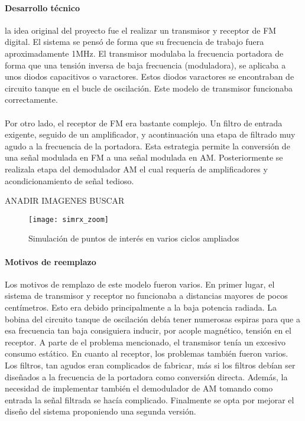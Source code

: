 \paragraph{Desarrollo técnico}
la idea original del proyecto fue el realizar un transmisor y receptor de FM digital. El sistema se pensó de forma que su frecuencia de trabajo fuera aproximadamente 1MHz. 
El transmisor modulaba la frecuencia portadora de forma que una tensión inversa de baja frecuencia (moduladora), se aplicaba a unos diodos capacitivos o varactores. Estos diodos varactores se encontraban de circuito tanque en el bucle de oscilación.
Este modelo de transmisor funcionaba correctamente.

\paragraph{}
Por otro lado, el receptor de FM era bastante complejo. Un filtro de entrada exigente, seguido de un amplificador, y acontinuación una etapa de filtrado muy agudo a la frecuencia de la portadora. Esta estrategia permite la conversión de una señal modulada en FM a una señal modulada en AM. Posteriormente se realizala etapa del demodulador AM el cual requería de amplificadores y acondicionamiento de señal tedioso.  

ANADIR IMAGENES BUSCAR
\begin{figure}[h]
    \centering
    \texttt{[image: simrx\_zoom]}
    \caption{Simulación de puntos de interés en varios ciclos ampliados}
    \label{fig:simrx_zoom}
\end{figure}

\paragraph{Motivos de reemplazo}
Los motivos de remplazo de este modelo fueron varios.
En primer lugar, el sistema de transmisor y receptor no funcionaba a distancias mayores de pocos centímetros. Esto era debido principalmente a la baja potencia radiada. La bobina del circuito tanque de oscilación debía tener numerosas espiras para que a esa frecuencia tan baja consiguiera inducir, por acople magnético, tensión en el receptor.
A parte de el problema mencionado, el transmisor tenía un excesivo consumo estático. En cuanto al receptor, los problemas también fueron varios. Los filtros, tan agudos eran complicados de fabricar, más si los filtros debían ser diseñados a la frecuencia de la portadora como conversión directa. Además, la necesidad de implementar también el demodulador de AM tomando como entrada la señal filtrada se hacía complicado.
Finalmente se opta por mejorar el diseño del sistema proponiendo una segunda versión.
